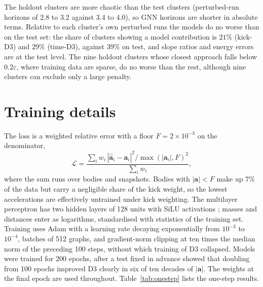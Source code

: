 \documentclass[a4paper,journal]{IEEEtran}
\newcommand{\vect}[1]{\mathbf{#1}}
\begin{document}
The holdout clusters are more chaotic than the test clusters (perturbed-run horizons of 2.8 to 3.2 against 3.4 to 4.0), so GNN horizons are shorter in absolute terms. Relative to each cluster's own perturbed runs the models do no worse than on the test set: the share of clusters showing a model contribution is $21\%$ (kick-D3) and $29\%$ (time-D3), against $39\%$ on test, and slope ratios and energy errors are at the test level. The nine holdout clusters whose closest approach falls below $0.2\varepsilon$, where training data are sparse, do no worse than the rest, although nine clusters can exclude only a large penalty.

\section{Training details}\label{app:training}

The loss is a weighted relative error with a floor $F=2\times10^{-3}$ on the denominator,
\begin{equation}
\mathcal L=\frac{\sum_i w_i\,|\hat{\vect a}_i-\vect a_i|^2/\max(|\vect a_i|,F)^2}{\sum_i w_i},
\end{equation}
where the sum runs over bodies and snapshots. Bodies with $|\vect a|<F$ make up $7\%$ of the data but carry a negligible share of the kick weight, so the lowest accelerations are effectively untrained under kick weighting. The multilayer perceptron has two hidden layers of 128 units with SiLU activations \cite{Elfwing2018}; masses and distances enter as logarithms, standardised with statistics of the training set. Training uses Adam \cite{Kingma2015} with a learning rate decaying exponentially from $10^{-3}$ to $10^{-4}$, batches of 512 graphs, and gradient-norm clipping \cite{Pascanu2013} at ten times the median norm of the preceding 100 steps, without which training of D3 collapsed. Models were trained for 200 epochs, after a test fixed in advance showed that doubling from 100 epochs improved D3 clearly in six of ten decades of $|\vect a|$. The weights at the final epoch are used throughout. Table~\ref{tab:onestep} lists the one-step results.
\end{document}
